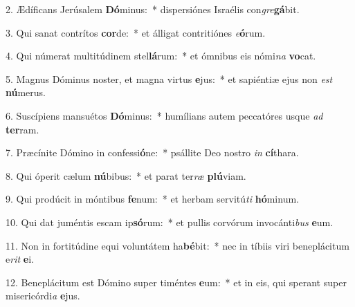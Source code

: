 2. Ædíficans Jerúsalem \textbf{Dó}minus:~*  dispersiónes Israélis con\textit{gre}\textbf{gá}bit.\

3. Qui sanat contrítos \textbf{cor}de:~*  et álligat contritiónes \textit{e}\textbf{ó}rum.\

4. Qui númerat multitúdinem stel\textbf{lá}rum:~*  et ómnibus eis nómi\textit{na} \textbf{vo}cat.\

5. Magnus Dóminus noster, et magna virtus \textbf{e}jus:~*  et sapiéntiæ ejus non \textit{est} \textbf{nú}merus.\

6. Suscípiens mansuétos \textbf{Dó}minus:~*  humílians autem peccatóres usque \textit{ad} \textbf{ter}ram.\

7. Præcínite Dómino in confessi\textbf{ó}ne:~*  psállite Deo nostro \textit{in} \textbf{cí}thara.\

8. Qui óperit cælum \textbf{nú}bibus:~*  et parat ter\textit{ræ} \textbf{plú}viam.\

9. Qui prodúcit in móntibus \textbf{fe}num:~*  et herbam servitú\textit{ti} \textbf{hó}minum.\

10. Qui dat juméntis escam ip\textbf{só}rum:~*  et pullis corvórum invocánti\textit{bus} \textbf{e}um.\

11. Non in fortitúdine equi voluntátem ha\textbf{bé}bit:~*  nec in tíbiis viri beneplácitum e\textit{rit} \textbf{e}i.\

12. Beneplácitum est Dómino super timéntes \textbf{e}um:~*  et in eis, qui sperant super misericórdi\textit{a} \textbf{e}jus.\

